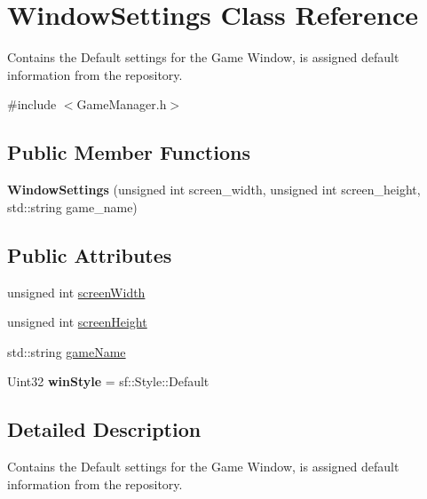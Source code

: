 \hypertarget{struct_window_settings}{}\section{Window\+Settings Class Reference}
\label{struct_window_settings}


Contains the Default settings for the Game Window, is assigned default information from the repository.  




{\ttfamily \#include $<$Game\+Manager.\+h$>$}

\subsection*{Public Member Functions}
\begin{DoxyCompactItemize}
\item 
\mbox{\label{struct_window_settings_a9f3cfa671a3f8888a0644bd4df82f2ab}} 
{\bfseries Window\+Settings} (unsigned int screen\+\_\+width, unsigned int screen\+\_\+height, std\+::string game\+\_\+name)
\end{DoxyCompactItemize}
\subsection*{Public Attributes}
\begin{DoxyCompactItemize}
\item 
unsigned int \hyperlink{struct_window_settings_a92700db968541f97969b92c619387632}{screen\+Width}
\item 
unsigned int \hyperlink{struct_window_settings_a7a55e4202ec4cf5a902705378aaeba05}{screen\+Height}
\item 
std\+::string \hyperlink{struct_window_settings_a32c14bbed2528fb85dad16f4c51facba}{game\+Name}
\item 
\mbox{\label{struct_window_settings_a516e48e18e091b958e2641691441f19c}} 
Uint32 {\bfseries win\+Style} = sf\+::\+Style\+::\+Default
\end{DoxyCompactItemize}


\subsection{Detailed Description}
Contains the Default settings for the Game Window, is assigned default information from the repository. 

